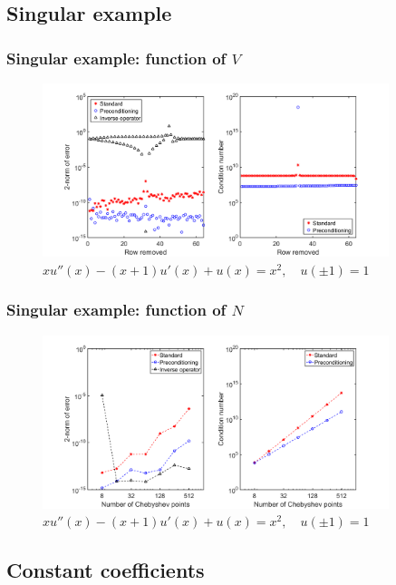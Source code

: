 \documentclass{beamer}
\begin{document}
\subsection{Singular example}

\begin{frame}
\frametitle{Singular example: function of $V$}
\begin{figure}
\includegraphics[width=0.9\textwidth]{example_SingCoeffs_02.png}
\caption{$x u''(x) - (x+1) u'(x) + u(x) = x^2, \quad u(\pm 1) = 1$}
\end{figure}
\end{frame}

\begin{frame}
\frametitle{Singular example: function of $N$}
\begin{figure}
\includegraphics[width=0.9\textwidth]{example_SingCoeffs_03.png}
\caption{$x u''(x) - (x+1) u'(x) + u(x) = x^2, \quad u(\pm 1) = 1$}
\end{figure}
\end{frame}

\subsection{Constant coefficients}
\end{document}

